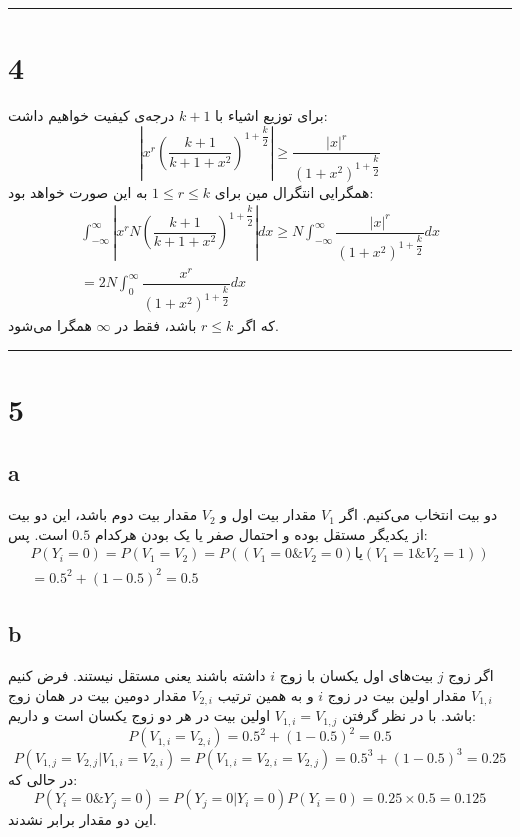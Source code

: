 \documentclass{article}
\begin{document}
\rule{\linewidth}{1pt}

\section*{4}
برای توزیع اشیاء با
$k+1$
درجه‌ی کیفیت خواهیم داشت:
$$\left| x^{r}\left( \dfrac{k+1}{k+1+x^{2}}\right) ^{1+\dfrac{k}{2}}\right| \geq \dfrac{\left| x\right| ^{r}}{\left( 1+x^{2}\right) ^{1+\dfrac{k}{2}}}$$
همگرایی انتگرال
مین
برای
$1 \leq r \leq k$
به این صورت خواهد بود:
$$\begin{aligned}\int ^{\infty }_{-\infty }\left| x^{r}N\left( \dfrac{k+1}{k+1+x^{2}}\right) ^{1+\dfrac{k}{2}}\right| dx\geq N\int _{-\infty }^{\infty }\dfrac{\left| x\right| ^{r}}{\left( 1+x^{2}\right) ^{1+\dfrac{k}{2}}}dx\\ =2N\int _{0}^{\infty }\dfrac{x^{r}}{\left( 1+x^{2}\right) ^{1+\dfrac{k}{2}}}dx\end{aligned}$$
که اگر
$r \leq k$
باشد، فقط در
$\infty$
همگرا می‌شود.

\rule{\linewidth}{1pt}

\section*{5}
\subsection*{a}
دو بیت انتخاب می‌کنیم. اگر
$V_1$
مقدار بیت اول و
$V_2$
مقدار بیت دوم باشد، این دو بیت از یکدیگر مستقل بوده و احتمال صفر یا یک بودن هرکدام
$0.5$
است. پس:
$$\begin{aligned}P\left( Y_{i}=0\right) =P\left( V_{1}=V_{2}\right) =P\left( (V_{1}=0\& V_{2}=0) \text{یا} (V_{1}=1\& V_{2}=1)\right) \\ =0.5^{2}+\left( 1-0.5\right) ^{2}=0.5\end{aligned}$$

\subsection*{b}
اگر زوج
$j$
بیت‌های اول یکسان با زوج
$i$
داشته باشند یعنی مستقل نیستند.
فرض کنیم
$V_{1,i}$
مقدار اولین بیت در زوج
$i$
و به همین ترتیب
$V_{2,i}$
مقدار دومین بیت در همان زوج باشد. با در نظر گرفتن
$V_{1,i} = V_{1,j}$
اولین بیت در هر دو زوج یکسان است و داریم:
$$P( V_{1,i}= V_{2,i}) =0.5^{2}+\left( 1-0.5\right) ^{2}=0.5$$
$$P( V_{1,j}= V_{2,j}| V_{1,i}= V_{2,i}) =P( V_{1,i}=V_{2,i}= V_{2,j}) =0.5^{3}+\left( 1-0.5\right) ^{3}=0.25$$
در حالی که:
$$P( Y_{i}=0\& Y_{j}= 0) =P( Y_{j}= 0| Y_{i}= 0) P( Y_{i}= 0) =0.25\times 0.5=0.125$$
این دو مقدار برابر نشدند.
\end{document}
